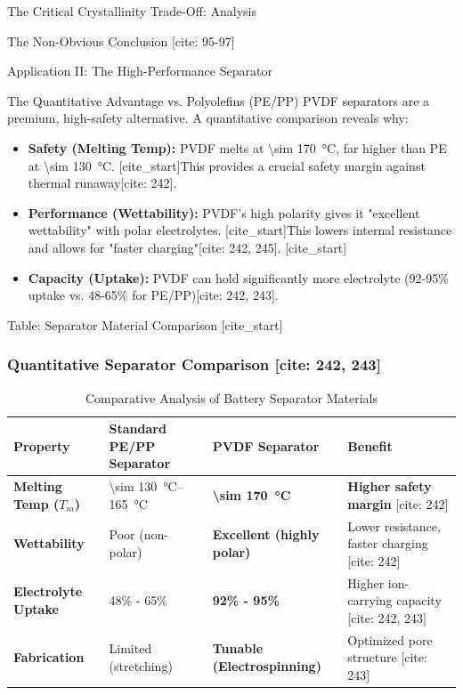 \documentclass[aspectratio=169]{beamer}
\begin{document}
\begin{frame}{The Critical Crystallinity Trade-Off: Analysis}
\begin{alertblock}{The Non-Obvious Conclusion [cite: 95-97]}
\begin{frame}{Application II: The High-Performance Separator}
    \begin{alertblock}{The Quantitative Advantage vs. Polyolefins (PE/PP)}
        PVDF separators are a premium, high-safety alternative. A quantitative comparison reveals why:
        \begin{itemize}
            \item \textbf{Safety (Melting Temp):} PVDF melts at \SI{\sim 170}{\celsius}, far higher than PE at \SI{\sim 130}{\celsius}. [cite_start]This provides a crucial safety margin against thermal runaway[cite: 242].
            \item \textbf{Performance (Wettability):} PVDF's high polarity gives it "excellent wettability" with polar electrolytes. [cite_start]This lowers internal resistance and allows for "faster charging"[cite: 242, 245].
            [cite_start]\item \textbf{Capacity (Uptake):} PVDF can hold significantly more electrolyte (92-95\% uptake vs. 48-65\% for PE/PP)[cite: 242, 243].
        \end{itemize}
    \end{alertblock}
\end{frame}

\begin{frame}{Table: Separator Material Comparison}
    [cite_start]\frametitle{Quantitative Separator Comparison [cite: 242, 243]}
    \begin{table}
        \centering
        \small
        \caption{Comparative Analysis of Battery Separator Materials}
        \begin{tabular}{l l l l}
            \toprule
            \textbf{Property} & \textbf{Standard PE/PP Separator} & \textbf{PVDF Separator} & \textbf{Benefit} \\
            \midrule
            [cite_start]\textbf{Melting Temp ($T_m$)} & \SIrange{\sim 130}{165}{\celsius} & \textbf{\SI{\sim 170}{\celsius}} & \textbf{Higher safety margin} [cite: 242] \\
            [cite_start]\textbf{Wettability} & Poor (non-polar) & \textbf{Excellent (highly polar)} & Lower resistance, faster charging [cite: 242] \\
            [cite_start]\textbf{Electrolyte Uptake} & 48\% - 65\% & \textbf{92\% - 95\%} & Higher ion-carrying capacity [cite: 242, 243] \\
            [cite_start]\textbf{Fabrication} & Limited (stretching) & \textbf{Tunable (Electrospinning)} & Optimized pore structure [cite: 243] \\
            \bottomrule
        \end{tabular}
    \end{table}
\end{frame}


\end{alertblock}
\end{frame}
\end{document}
